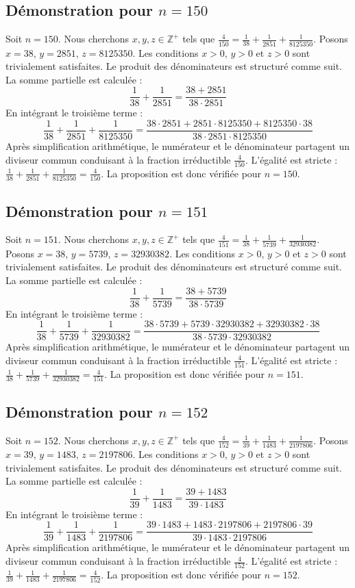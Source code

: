 \documentclass[11pt,a4paper]{article}
\begin{document}
\subsection{Démonstration pour $n = 150$}
Soit $n = 150$. Nous cherchons $x, y, z \in \mathbb{Z}^{+}$ tels que $\frac{4}{150} = \frac{1}{38} + \frac{1}{2851} + \frac{1}{8125350}$.
Posons $x = 38$, $y = 2851$, $z = 8125350$.
Les conditions $x > 0$, $y > 0$ et $z > 0$ sont trivialement satisfaites.
Le produit des dénominateurs est structuré comme suit. La somme partielle est calculée :
$$ \frac{1}{38} + \frac{1}{2851} = \frac{38+2851}{38 \cdot 2851} $$
En intégrant le troisième terme :
$$ \frac{1}{38} + \frac{1}{2851} + \frac{1}{8125350} = \frac{38 \cdot 2851 + 2851 \cdot 8125350 + 8125350 \cdot 38}{38 \cdot 2851 \cdot 8125350} $$
Après simplification arithmétique, le numérateur et le dénominateur partagent un diviseur commun conduisant à la fraction irréductible $\frac{4}{150}$.
L'égalité est stricte : $\frac{1}{38} + \frac{1}{2851} + \frac{1}{8125350} = \frac{4}{150}$.
La proposition est donc vérifiée pour $n = 150$.
\subsection{Démonstration pour $n = 151$}
Soit $n = 151$. Nous cherchons $x, y, z \in \mathbb{Z}^{+}$ tels que $\frac{4}{151} = \frac{1}{38} + \frac{1}{5739} + \frac{1}{32930382}$.
Posons $x = 38$, $y = 5739$, $z = 32930382$.
Les conditions $x > 0$, $y > 0$ et $z > 0$ sont trivialement satisfaites.
Le produit des dénominateurs est structuré comme suit. La somme partielle est calculée :
$$ \frac{1}{38} + \frac{1}{5739} = \frac{38+5739}{38 \cdot 5739} $$
En intégrant le troisième terme :
$$ \frac{1}{38} + \frac{1}{5739} + \frac{1}{32930382} = \frac{38 \cdot 5739 + 5739 \cdot 32930382 + 32930382 \cdot 38}{38 \cdot 5739 \cdot 32930382} $$
Après simplification arithmétique, le numérateur et le dénominateur partagent un diviseur commun conduisant à la fraction irréductible $\frac{4}{151}$.
L'égalité est stricte : $\frac{1}{38} + \frac{1}{5739} + \frac{1}{32930382} = \frac{4}{151}$.
La proposition est donc vérifiée pour $n = 151$.
\subsection{Démonstration pour $n = 152$}
Soit $n = 152$. Nous cherchons $x, y, z \in \mathbb{Z}^{+}$ tels que $\frac{4}{152} = \frac{1}{39} + \frac{1}{1483} + \frac{1}{2197806}$.
Posons $x = 39$, $y = 1483$, $z = 2197806$.
Les conditions $x > 0$, $y > 0$ et $z > 0$ sont trivialement satisfaites.
Le produit des dénominateurs est structuré comme suit. La somme partielle est calculée :
$$ \frac{1}{39} + \frac{1}{1483} = \frac{39+1483}{39 \cdot 1483} $$
En intégrant le troisième terme :
$$ \frac{1}{39} + \frac{1}{1483} + \frac{1}{2197806} = \frac{39 \cdot 1483 + 1483 \cdot 2197806 + 2197806 \cdot 39}{39 \cdot 1483 \cdot 2197806} $$
Après simplification arithmétique, le numérateur et le dénominateur partagent un diviseur commun conduisant à la fraction irréductible $\frac{4}{152}$.
L'égalité est stricte : $\frac{1}{39} + \frac{1}{1483} + \frac{1}{2197806} = \frac{4}{152}$.
La proposition est donc vérifiée pour $n = 152$.
\end{document}
